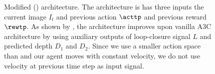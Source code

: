\begin{figure}%
\begin{center}
\scalebox{1.3}{}%
\end{center}
\caption{Modified \NavAiiiCDiDiiL{} (\cite{MiPaViICLR2017}) architecture.
The architecture is has three inputs the current image $I_t$ and previous action $\acttp$ and previous reward $\rewtp$.
As shown by \cite{MiPaViICLR2017}, the architecture improves upon vanilla A3C architecture by using auxiliary outputs of loop-closure signal $L$ and predicted depth $D_1$ and $D_2$.
Since we use a smaller action space than \cite{MiPaViICLR2017} and our agent moves with constant velocity, we do not use velocity at previous time step as input signal.}
\label{fig:architectures}
\end{figure}
